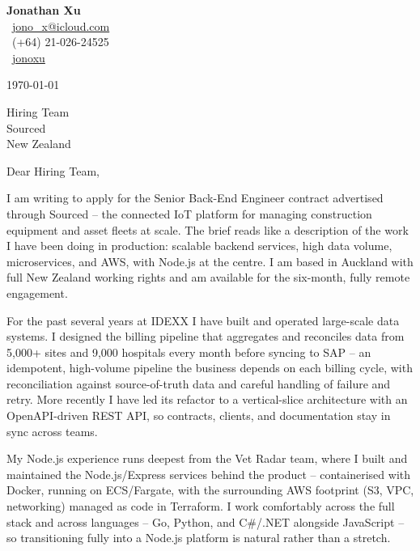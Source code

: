 \documentclass[11pt,a4paper]{article}
\begin{document}
\begin{flushright}
{\Large\textbf{Jonathan Xu}}\\[0.3em]
\faEnvelope\ \href{mailto:jono_x@icloud.com}{jono\_x@icloud.com} \\
\faPhone\ (+64) 21-026-24525 \\
\faLinkedin\ \href{https://www.linkedin.com/in/jonathan-x-4aba55115}{jonoxu}
\end{flushright}

\vspace{0.5em}

\today

\vspace{0.5em}

Hiring Team \\
Sourced \\
New Zealand

\vspace{0.5em}

Dear Hiring Team,

I am writing to apply for the Senior Back-End Engineer contract advertised through Sourced -- the connected IoT platform for managing construction equipment and asset fleets at scale. The brief reads like a description of the work I have been doing in production: scalable backend services, high data volume, microservices, and AWS, with Node.js at the centre. I am based in Auckland with full New Zealand working rights and am available for the six-month, fully remote engagement.

For the past several years at IDEXX I have built and operated large-scale data systems. I designed the billing pipeline that aggregates and reconciles data from 5,000+ sites and 9,000 hospitals every month before syncing to SAP -- an idempotent, high-volume pipeline the business depends on each billing cycle, with reconciliation against source-of-truth data and careful handling of failure and retry. More recently I have led its refactor to a vertical-slice architecture with an OpenAPI-driven REST API, so contracts, clients, and documentation stay in sync across teams.

My Node.js experience runs deepest from the Vet Radar team, where I built and maintained the Node.js/Express services behind the product -- containerised with Docker, running on ECS/Fargate, with the surrounding AWS footprint (S3, VPC, networking) managed as code in Terraform. I work comfortably across the full stack and across languages -- Go, Python, and C\#/.NET alongside JavaScript -- so transitioning fully into a Node.js platform is natural rather than a stretch.
\end{document}
